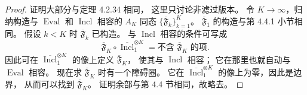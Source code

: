 \begin{proof}
证明大部分与定理 4.2.34 相同，
这里只讨论非滤过版本。
令 $K\to\infty$，归纳构造与
$\operatorname{Eval}$ 和 $\operatorname{Incl}$ 相容的
$A_K$ 同态 $\{\overline{\mathfrak F}_k\}_{k=1}^{K}$。
$\overline{\mathfrak F}_1$ 的构造与第 4.4.1 小节相同。
假设 $k<K$ 时 $\overline{\mathfrak F}_k$ 已构造。
与 $\operatorname{Incl}$ 相容的条件可写成
\[
\overline{\mathfrak F}_K\circ
\overline{\operatorname{Incl}}_1^{\otimes K}
=\text{不含 $\overline{\mathfrak F}_K$ 的项}.
\]
因此可在 $\overline{\operatorname{Incl}}_1^{\otimes K}$
的像上定义 $\overline{\mathfrak F}_K$，
使其与 $\operatorname{Incl}$ 相容；
它在那里也就自动与 $\operatorname{Eval}$ 相容。
现在求 $\overline{\mathfrak F}_K$ 时有一个障碍圈。
它在 $\overline{\operatorname{Incl}}_1^{\otimes K}$
的像上为零，因此是边界，
从而可以找到 $\overline{\mathfrak F}_K$。
证明余部与第 4.4 节相同，故略去。
\end{proof}
